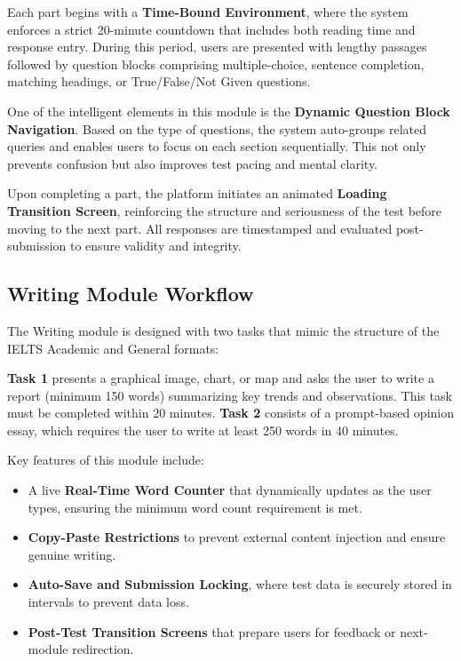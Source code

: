 \documentclass[a4paper,12pt]{article}
\begin{document}
Each part begins with a \textbf{Time-Bound Environment}, where the system enforces a strict 20-minute countdown that includes both reading time and response entry. During this period, users are presented with lengthy passages followed by question blocks comprising multiple-choice, sentence completion, matching headings, or True/False/Not Given questions.

One of the intelligent elements in this module is the \textbf{Dynamic Question Block Navigation}. Based on the type of questions, the system auto-groups related queries and enables users to focus on each section sequentially. This not only prevents confusion but also improves test pacing and mental clarity.

Upon completing a part, the platform initiates an animated \textbf{Loading Transition Screen}, reinforcing the structure and seriousness of the test before moving to the next part. All responses are timestamped and evaluated post-submission to ensure validity and integrity.

\vspace{0.5cm}

\subsection{Writing Module Workflow}

The Writing module is designed with two tasks that mimic the structure of the IELTS Academic and General formats:

\textbf{Task 1} presents a graphical image, chart, or map and asks the user to write a report (minimum 150 words) summarizing key trends and observations. This task must be completed within 20 minutes. \textbf{Task 2} consists of a prompt-based opinion essay, which requires the user to write at least 250 words in 40 minutes.

Key features of this module include:
\begin{itemize}
    \item A live \textbf{Real-Time Word Counter} that dynamically updates as the user types, ensuring the minimum word count requirement is met.
    \item \textbf{Copy-Paste Restrictions} to prevent external content injection and ensure genuine writing.
    \item \textbf{Auto-Save and Submission Locking}, where test data is securely stored in intervals to prevent data loss.
    \item \textbf{Post-Test Transition Screens} that prepare users for feedback or next-module redirection.
\end{itemize}
\end{document}
